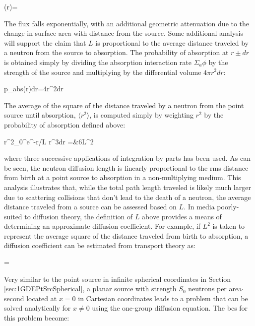 \beq
\phi(r)=
\eeq

The flux falls exponentially, with an additional geometric attenuation due to the change in surface area with distance from the source. Some additional analysis will support the claim that \(L\) is proportional to the average distance traveled by a neutron from the source to absorption. The probability of absorption at \(r\pm dr\) is obtained simply by dividing the absorption interaction rate \(\Sigma_a\phi\) by the strength of the source and multiplying by the differential volume \(4\pi r^2dr\):

\beq
p_{abs}(r)dr=4\pi r^2dr
\eeq

The average of the square of the distance traveled by a neutron from the point source until absorption, \(\langle r^2\rangle\), is computed simply by weighting \(r^2\) by the probability of absorption defined above:

\beqa
\langle r^2\rangle\equiv{}\int_{0}^\infty e^{-r/L} r^3dr
=&6L^2
\eeqa

where three successive applications of integration by parts has been used. As can be seen, the neutron diffusion length is linearly proportional to the \gls{rms} distance from birth at a point source to absorption in a non-multiplying medium. This analysis illustrates that, while the total path length traveled is likely much larger due to scattering collisions that don't lead to the death of a neutron, the average distance traveled from a source can be assessed based on \(L\). In media poorly-suited to diffusion theory, the definition of \(L\) above provides a means of determining an approximate diffusion coefficient. For example, if \(L^2\) is taken to represent the average square of the distance traveled from birth to absorption, a diffusion coefficient can be estimated from transport theory as:

\beq
{}=
\eeq


Very similar to the point source in infinite spherical coordinates in Section \ref{sec:1GDEPtSrcSpherical}, a planar source with strength \(S_0\) neutrons per area\(\cdot\)second located at \(x=0\) in Cartesian coordinates leads to a problem that can be solved analytically for \(x\neq0\) using the one-group diffusion equation. The \glspl{bc} for this problem become:

